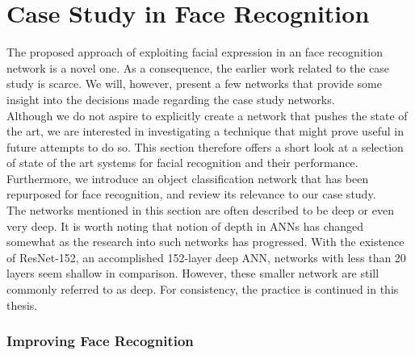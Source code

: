 \begin{comment}
Things that could be added:
- tensorboard and digits are still being worked on. deepvis not so much
- keyword is live / real-time
\end{comment}


\section{Case Study in Face Recognition}

The proposed approach of exploiting facial expression in an face recognition network is a novel one. As a consequence, the earlier work related to the case study is scarce. We will, however, present a few networks that provide some insight into the decisions made regarding the case study networks. \\

\noindent Although we do not aspire to explicitly create a network that pushes the state of the art, we are interested in investigating a technique that might prove useful in future attempts to do so. This section therefore offers a short look at a selection of state of the art systems for facial recognition and their performance. Furthermore, we introduce an object classification network that has been repurposed for face recognition, and review its relevance to our case study. \\

\noindent The networks mentioned in this section are often described to be deep or even very deep. It is worth noting that notion of depth in ANNs has changed somewhat as the research into such networks has progressed. With the existence of ResNet-152, an accomplished 152-layer deep ANN, networks with less than 20 layers seem shallow in comparison. However, these smaller network are still commonly referred to as deep. For consistency, the practice is continued in this thesis. 

\subsubsection{Improving Face Recognition}

